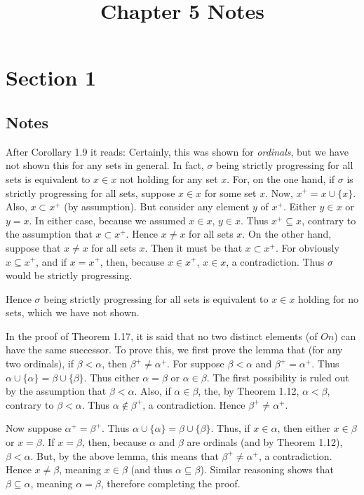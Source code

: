 \documentclass{article}
\title{Chapter 5 Notes}
\theoremstyle{definition}
\begin{document}
\date{}
\maketitle

\section*{Section 1}

\subsection*{Notes}
After Corollary 1.9 it reads:  Certainly, this was shown for 
\textit{ordinals}, but we have not shown this for any sets in general. In fact, $\sigma$ being strictly progressing for all sets 
is equivalent to $x\in x$ not holding for any set $x$. For, on the one hand, if $\sigma$ is strictly progressing for all sets, 
suppose $x\in x$ for some set $x$. Now, $x^+=x\cup\{x\}$. Also, $x\subset x^+$ (by assumption). But consider any element $y$
of $x^+$. Either $y\in x$ or $y=x$. In either case, because we assumed $x\in x$, $y\in x$. Thus $x^+\subseteq x$, contrary to the 
assumption that $x\subset x^+$. Hence $x\ne x$ for all sets $x$. On the other hand, suppose that $x\ne x$ for all sets 
$x$. Then it must be that $x\subset x^+$. For obviously $x\subseteq x^+$, and if $x=x^+$, then, because $x\in x^+$, 
$x\in x$, a contradiction. Thus $\sigma$ would be strictly progressing.

Hence $\sigma$ being strictly progressing for all sets is equivalent to $x\in x$ holding for no sets, which we have not shown.

In the proof of Theorem 1.17, it is said that no two distinct elements (of $On$) can have the same successor. To prove this, we 
first prove the lemma that (for any two ordinals), if $\beta<\alpha$, then $\beta^+\ne\alpha^+$. For suppose 
$\beta<\alpha$ and $\beta^+=\alpha^+$. Thus $\alpha\cup\{\alpha\}=\beta\cup\{\beta\}$. Thus either $\alpha=\beta$ or 
$\alpha\in\beta$. The first possibility is ruled out by the assumption that $\beta<\alpha$. Also, if $\alpha\in\beta$, the, 
by Theorem 1.12, $\alpha<\beta$, contrary to $\beta<\alpha$. Thus $\alpha\notin\beta^+$, a contradiction. Hence 
$\beta^+\ne\alpha^+$. 

Now suppose $\alpha^+=\beta^+$. Thus $\alpha\cup\{\alpha\}=\beta\cup\{\beta\}$. Thus, if $x\in\alpha$, then 
either $x\in\beta$ or $x=\beta$. If $x=\beta$, then, because $\alpha$ and $\beta$ are ordinals (and by Theorem 1.12), 
$\beta<\alpha$. But, by the above lemma, this means that $\beta^+\ne\alpha^+$, a contradiction. Hence $x\ne\beta$, meaning 
$x\in\beta$ (and thus $\alpha\subseteq\beta$). Similar reasoning shows that $\beta\subseteq\alpha$, meaning 
$\alpha=\beta$, therefore completing the proof.
\end{document}

